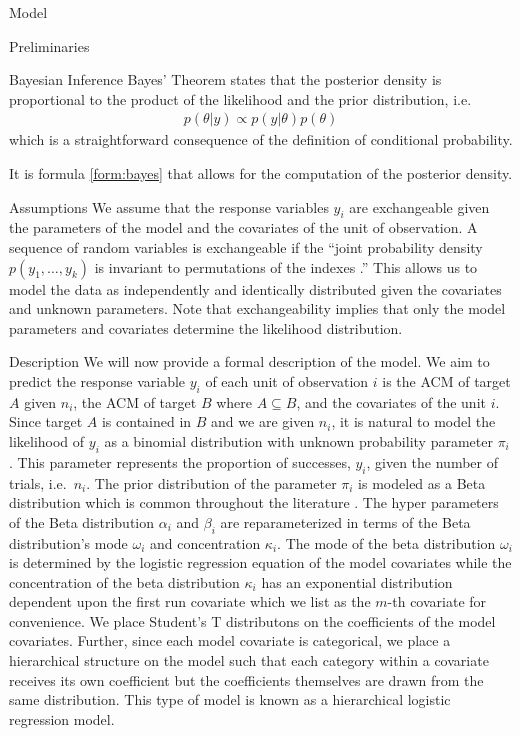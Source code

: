 \begin{chapter}{Model}
\begin{section}{Preliminaries}
\begin{subsection}{Bayesian Inference}
    Bayes' Theorem states that the posterior density is proportional to the product
    of the likelihood and the prior distribution, i.e.\
    \begin{align}\label{form:bayes}
      p(\theta | y) \propto p(y | \theta) p(\theta)
    \end{align}
    which is a straightforward consequence of the definition of conditional probability.

    It is formula \ref{form:bayes} that allows for the computation of the posterior density.
  \end{subsection}
\end{section}

\begin{section}{Assumptions}
  We assume that the response variables $y_i$ are exchangeable given the parameters of the model
  and the covariates of the unit of observation. A sequence of random variables
  is exchangeable if the ``joint probability density $p(y_1, \dots, y_k)$ is invariant to permutations of the indexes \cite{bda3}.''
  This allows us to model the data as independently and identically distributed given the covariates and unknown parameters.
  Note that exchangeability implies that only the model parameters and covariates determine the likelihood distribution.
\end{section}

\begin{section}{Description}
  We will now provide a formal description of the model.
  We aim to predict the response variable $y_i$ of each unit of
  observation $i$ is the ACM of target $A$ given $n_i$, the ACM of target $B$ where $A \subseteq B$,
  and the covariates of the unit $i$. Since target $A$ is
  contained in $B$ and we are given $n_i$, it is natural to model the likelihood of
  $y_i$ as a binomial distribution with unknown probability parameter $\pi_i$. This parameter
  represents the proportion of successes, $y_i$, given the number of trials, i.e.\ $n_i$.
  The prior distribution of the parameter $\pi_i$ is modeled as a Beta distribution which
  is common throughout the literature \cite{bda3, kruschke}.
  The hyper parameters of the Beta distribution $\alpha_i$ and $\beta_i$ are reparameterized in terms of the Beta distribution's
  mode $\omega_i$ and concentration $\kappa_i$.
  The mode of the beta distribution $\omega_i$ is determined by the logistic regression equation
  of the model covariates while
  the concentration of the beta distribution $\kappa_i$ has an exponential distribution dependent upon the
  first run covariate which we list as the $m$-th covariate for convenience.
  We place Student's T distributons on the coefficients of the model covariates. Further, since each model covariate is categorical,
  we place a hierarchical structure on the model such that each category within a covariate receives its own coefficient
  but the coefficients themselves are drawn from the same distribution. This type of model is known as a hierarchical logistic regression model.


\end{section}
\end{chapter}
